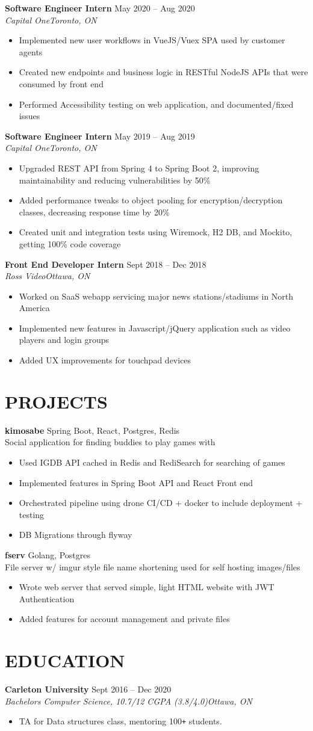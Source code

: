 \documentclass[letterpaper]{article}
\newcommand{\NewPart}[1]{\section*{\large\uppercase{\textbf{#1}}}}
\newcommand{\DatedEntry}[5]{\small\textbf{#1}
	\hfill \small{#2}\\
	\textit{#3}\hfill\textit{#4}\\\vspace{0.1cm}
	#5\vspace{0.1cm}
}
\newcommand{\ProjectEntry}[4]{\textbf{#1}
	\hfill \small{#2}\\
	#3\\\vspace{0.1cm}
	#4\vspace{0.1cm}
}
\begin{document}
\DatedEntry{Software Engineer Intern}
{May 2020 -- Aug 2020}
{Capital One}
{Toronto, ON}
{\begin{itemize}[nolistsep]
	\item Implemented new user workflows in VueJS/Vuex SPA used by customer agents
	\item Created new endpoints and business logic in RESTful NodeJS APIs that were consumed by front end
	\item Performed Accessibility testing on web application, and documented/fixed issues
\end{itemize}}
\DatedEntry{Software Engineer Intern}
{May 2019 -- Aug 2019}
{Capital One}
{Toronto, ON}
{\begin{itemize}[nolistsep]
	\item Upgraded REST API from Spring 4 to Spring Boot 2, improving maintainability and reducing vulnerabilities by 50\%
	\item Added performance tweaks to object pooling for encryption/decryption classes, decreasing response time by 20\%
	\item Created unit and integration tests using Wiremock, H2 DB, and Mockito, getting 100\% code coverage
\end{itemize}}
\DatedEntry{Front End Developer Intern}
{Sept 2018 -- Dec 2018}
{Ross Video}
{Ottawa, ON}
{\begin{itemize}[nolistsep]
	\item Worked on SaaS webapp servicing major news stations/stadiums in North America
	\item Implemented new features in Javascript/jQuery application such as video players and login groups
	\item Added UX improvements for touchpad devices
\end{itemize}}
\vspace{-0.3cm}

\NewPart{Projects}
\ProjectEntry{kimosabe}
{Spring Boot, React, Postgres, Redis}
{Social application for finding buddies to play games with}
{\begin{itemize}
	\item Used IGDB API cached in Redis and RediSearch for searching of games
	\item Implemented features in Spring Boot API and React Front end
	\item Orchestrated pipeline using drone CI/CD + docker to include deployment + testing
	\item DB Migrations through flyway
\end{itemize}}
\ProjectEntry{fserv}
{Golang, Postgres}
{File server w/ imgur style file name shortening used for self hosting images/files}
{\begin{itemize}
	\item Wrote web server that served simple, light HTML website with JWT Authentication
	\item Added features for account management and private files
\end{itemize}}\vspace{-0.3cm}

\NewPart{Education}
\DatedEntry{Carleton University}
{Sept 2016 -- Dec 2020}
{Bachelors Computer Science, 10.7/12 CGPA (3.8/4.0)}
{Ottawa, ON}
{\begin{itemize}
	\item TA for Data structures class, mentoring 100\texttt{+} students.
\end{itemize}}
\end{document}
